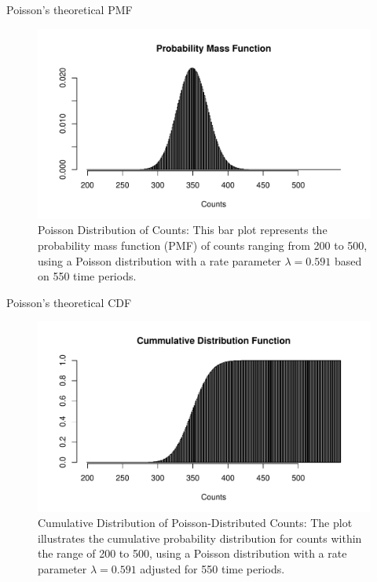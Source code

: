 \documentclass[english]{beamer}\usepackage[]{graphicx}\usepackage[]{xcolor}
\makeatletter
\def\maxwidth{ %
  \ifdim\Gin@nat@width>\linewidth
    \linewidth
  \else
    \Gin@nat@width
  \fi
}
\newenvironment{knitrout}{}{} %
\makeatother
\begin{document}
\begin{frame}{Poisson's theoretical PMF}
\begin{figure}
\begin{knitrout}
\color{fgcolor}
\includegraphics[width=\maxwidth]{figures/figunnamed-chunk-5-1} 
\end{knitrout}
  \caption{Poisson Distribution of Counts: This bar plot represents the probability mass function (PMF) of counts ranging from 200 to 500, using a Poisson distribution with a rate parameter $\lambda = 0.591$ based on 550 time periods.}
  \label{fig:2_3}
\end{figure}
\end{frame}

\begin{frame}{Poisson's theoretical CDF}

\begin{figure}
\begin{knitrout}
\color{fgcolor}
\includegraphics[width=\maxwidth]{figures/figunnamed-chunk-6-1} 
\end{knitrout}
  \caption{Cumulative Distribution of Poisson-Distributed Counts: The plot illustrates the cumulative probability distribution for counts within the range of 200 to 500, using a Poisson distribution with a rate parameter $\lambda = 0.591$ adjusted for 550 time periods.}
  \label{fig:2_4}
\end{figure}
\end{frame}
\end{document}

